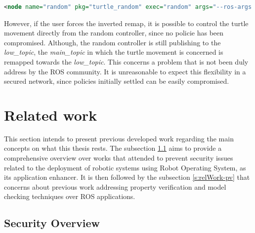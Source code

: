 \begin{lstlisting}[title={Attempting the \textit{low\_topic} remap.}, language=xml]
<node name="random" pkg="turtle_random" exec="random" args="--ros-args --enclave /random -r /low_topic:=/main_topic"/>
\end{lstlisting}

However, if the user forces the inverted remap, it is possible to control the turtle movement directly from the random controller, since no policie has been compromised. Although, the random controller is still publishing to the \textit{low\_topic}, the \textit{main\_topic} in which the turtle movement is concerned is remapped towards the \textit{low\_topic}. This concerns a problem that is not been duly address by the ROS community. It is unreasonable to expect this flexibility in a secured network, since policies initially settled can be easily compromised.

\section{Related work}\label{s:relWork}

This section intends to present previous developed work regarding the main concepts on what this thesis rests. The subsection \ref{s:relWork-sec} aims to provide a comprehensive overview over works that attended to prevent security issues related to the deployment of robotic systems using Robot Operating System, as its application enhancer. It is then followed by the subsection %
\ref{s:relWork-pv} that concerns about previous work addressing property verification and model checking techniques over ROS applications.

\subsection{Security Overview}\label{s:relWork-sec}


